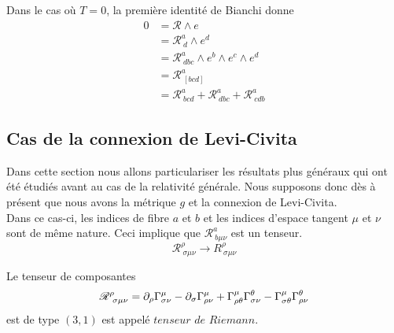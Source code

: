 \documentclass[a4paper,11pt]{report}
\begin{document}
                Dans le cas où $T = 0$, la première identité de Bianchi donne
                \begin{align}
                    0 &= \mathscr{R}\wedge e\\
                    &= \mathscr{R}^a_{~d}\wedge e^d\\
                    &= \mathscr{R}^a_{~dbc}\wedge e^b\wedge e^c\wedge e^d \\
                    &= \mathscr{R}^a_{~[bcd]}\\
                    &= \mathscr{R}^a_{~bcd}+\mathscr{R}^a_{~dbc}+\mathscr{R}^a_{~cdb}\label{eq:idbianchi}
                \end{align}
                
            \subsection{Cas de la connexion de Levi-Civita}
                        
                Dans cette section nous allons particulariser les résultats plus généraux qui ont été étudiés avant au cas de la relativité générale. Nous supposons donc dès à présent que nous avons la métrique $g$ et la connexion de Levi-Civita. \\
                
                Dans ce cas-ci, les indices de fibre $a$ et $b$ et les indices d'espace tangent $\mu$ et $\nu$ sont de même nature. Ceci implique que $\mathscr{R}^a_{~b\mu\nu}$ est un tenseur.
                \begin{equation*}
                    \mathscr{R}^\rho_{~\sigma\mu\nu}\to R^\rho_{~\sigma\mu\nu}
                \end{equation*}
                
                \begin{defn}
                    Le tenseur de composantes 
                    \begin{equation}
                        \mathscr{R}^\rho_{~\sigma\mu\nu} = \partial_\rho\Gamma^\mu_{\sigma \nu}-\partial_\sigma\Gamma^\mu_{\rho\nu} + \Gamma^\mu_{\rho \theta}\Gamma^\theta_{\sigma\nu}-\Gamma^\mu_{\sigma \theta}\Gamma^\theta_{\rho\nu}
                    \end{equation}
                    est de type $(3,1)$ est appelé $\textit{tenseur de Riemann}$.
                \end{defn}
                
\end{document}
